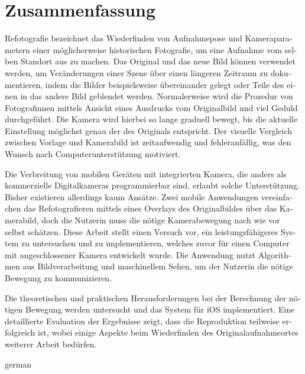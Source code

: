 \chapter*{Zusammenfassung}

\begin{otherlanguage}{german}

   Refotografie bezeichnet das Wiederfinden von Aufnahmepose und Kameraparametern
   einer möglicherweise historischen Fotografie, um eine Aufnahme vom selben
   Standort aus zu machen.  Das Original und das neue Bild
   können verwendet werden, um Veränderungen einer Szene über einen längeren
   Zeitraum zu dokumentieren, indem die Bilder beispielsweise übereinander gelegt
   oder Teile des einen in das andere Bild geblendet werden. Normalerweise wird die
   Prozedur von Fotografinnen mittels Ansicht eines Ausdrucks vom Originalbild und
   viel Geduld durchgeführt. Die Kamera wird hierbei so lange graduell bewegt, bis
   die aktuelle Einstellung möglichst genau der des Originals entspricht. Der
   visuelle Vergleich zwischen Vorlage und Kamerabild ist zeitaufwendig und
   fehleranfällig, was den Wunsch nach Computerunterstützung motiviert.

   Die Verbreitung von mobilen Geräten mit integrierten Kamera, die anders als
   kommerzielle Digitalkameras programmierbar sind, erlaubt solche Unterstützung.
   Bisher existieren allerdings kaum Ansätze. Zwei mobile Anwendungen vereinfachen 
   das Refotografieren mittels eines Overlays des Originalbildes über das
   Kamerabild, doch die Nutzerin muss die nötige Kamerabewegung nach wie vor selbst
   schätzen. Diese Arbeit stellt einen Versuch vor, ein leistungsfähigeres System
   zu untersuchen und zu implementieren, welches zuvor für
   einen Computer mit angeschlossener Kamera entwickelt wurde. Die Anwendung nutzt
   Algorithmen aus Bildverarbeitung und maschinellem Sehen, um der Nutzerin die
   nötige Bewegung zu kommunizieren.

   Die theoretischen und praktischen Herausforderungen bei der Berechnung der
   nötigen Bewegung werden untersucht und das System für iOS implementiert. Eine
   detaillierte Evaluation der Ergebnisse zeigt, dass die Reproduktion teilweise
   erfolgreich ist, wobei einige Aspekte beim Wiederfinden des
   Originalaufnahmeortes weiterer Arbeit bedürfen.

\end{otherlanguage}{german}
